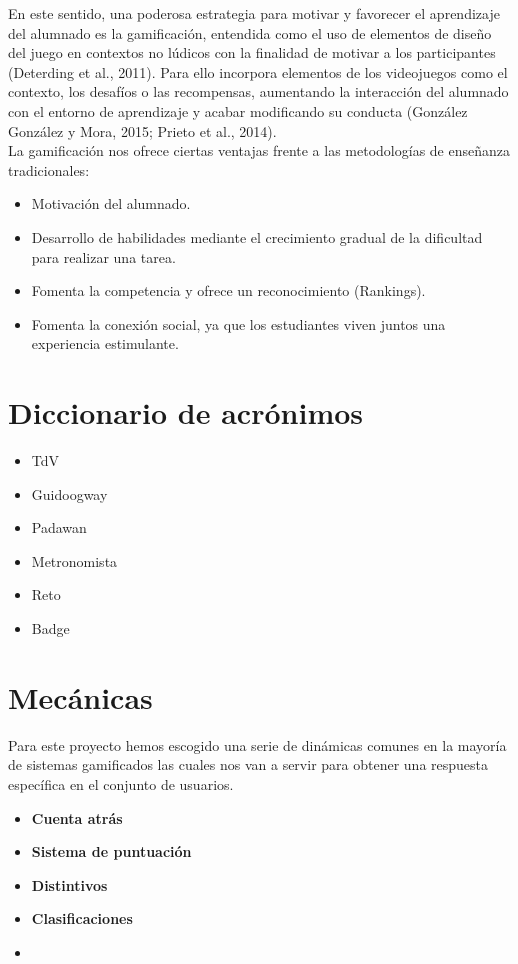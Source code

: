 En este sentido, una poderosa estrategia para motivar y favorecer el aprendizaje del alumnado es la gamificación, entendida como el uso de elementos de diseño del juego en contextos no lúdicos con la finalidad de motivar a los participantes (Deterding et al., 2011). Para ello incorpora elementos de los videojuegos como el contexto, los desafíos o las recompensas, aumentando la interacción del alumnado con el entorno de aprendizaje y acabar modificando su conducta (González González y Mora, 2015; Prieto et al., 2014).\\


La gamificación nos ofrece ciertas ventajas frente a las metodologías de enseñanza tradicionales:\\

\begin{itemize}
\item Motivación del alumnado.
\item Desarrollo de habilidades mediante el crecimiento gradual de la dificultad para realizar una tarea.
\item Fomenta la competencia y ofrece un reconocimiento (Rankings).
\item Fomenta la conexión social, ya que los estudiantes viven juntos una experiencia estimulante.
\end{itemize}

\section{Diccionario de acrónimos}
\begin{itemize}
\item \ac{TdV}
\item \ac{Guidoogway}
\item \ac{Padawan}
\item \ac{Metronomista}
\item \ac{Reto}
\item \ac{Badge}
\end{itemize}

\section{Mecánicas}

Para este proyecto hemos escogido una serie de dinámicas comunes en la mayoría de sistemas gamificados las cuales nos van a servir para obtener una respuesta específica en el conjunto de usuarios.

\begin{itemize}
	\item \textbf{Cuenta atrás}
	\item \textbf{Sistema de puntuación}
	\item \textbf{Distintivos}
	\item \textbf{Clasificaciones}
	\item \textbf{}
\end{itemize}

